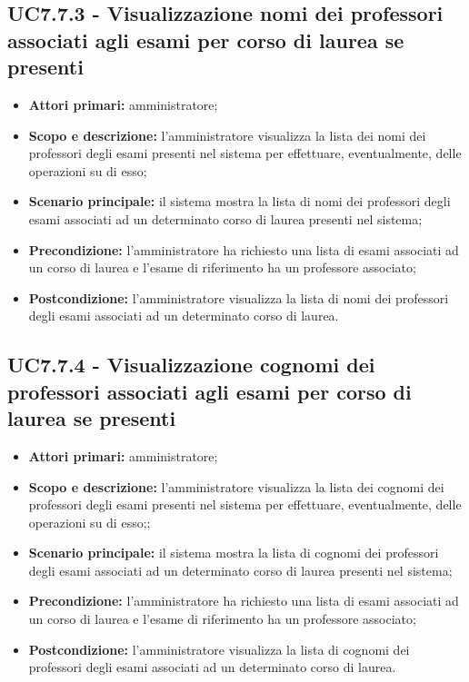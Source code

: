 \documentclass[AnalisiDeiRequisiti.tex]{subfiles}
\begin{document}
\subsection{UC7.7.3 - Visualizzazione nomi dei professori associati agli esami per corso di laurea se presenti}
\begin{itemize}
	\item \textbf{Attori primari:} amministratore;
	\item \textbf{Scopo e descrizione:} l'amministratore visualizza la lista dei nomi dei professori degli esami presenti nel sistema per effettuare, eventualmente, delle operazioni su di esso;
	\item \textbf{Scenario principale:} il sistema mostra la lista di nomi dei professori degli esami associati ad un determinato corso di laurea presenti nel sistema;
	\item \textbf{Precondizione:} l'amministratore ha richiesto una lista di esami associati ad un corso di laurea e l'esame di riferimento ha un professore associato; 
	\item \textbf{Postcondizione:} l'amministratore visualizza la lista di nomi dei professori degli esami associati ad un determinato corso di laurea.
\end{itemize}
\subsection{UC7.7.4 - Visualizzazione cognomi dei professori associati agli esami per corso di laurea se presenti}
\begin{itemize}
	\item \textbf{Attori primari:} amministratore;
	\item \textbf{Scopo e descrizione:} l'amministratore visualizza la lista dei cognomi dei professori degli esami presenti nel sistema per effettuare, eventualmente, delle operazioni su di esso;;
	\item \textbf{Scenario principale:} il sistema mostra la lista di cognomi dei professori degli esami associati ad un determinato corso di laurea presenti nel sistema;
	\item \textbf{Precondizione:} l'amministratore ha richiesto una lista di esami associati ad un corso di laurea e l'esame di riferimento ha un professore associato; 
	\item \textbf{Postcondizione:} l'amministratore visualizza la lista di cognomi dei professori degli esami associati ad un determinato corso di laurea.
\end{itemize}
\end{document}
